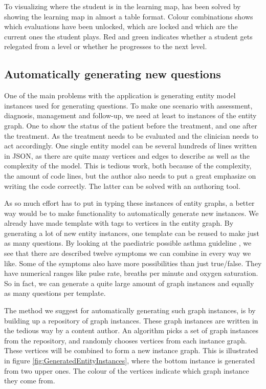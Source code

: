 To visualizing where the student is in the learning map, has been solved by showing the learning map in almost a table format. Colour combinations shows which evaluations have been unlocked, which are locked and which are the current ones the student plays. Red and green indicates whether a student gets relegated from a level or whether he progresses to the next level.	



 
\subsection{Automatically generating new questions}
One of the main problems with the application is generating entity model instances used for generating questions. To make one scenario with assessment, diagnosis, management and follow-up, we need at least to instances of the entity graph. One to show the status of the patient before the treatment, and one after the treatment. As the treatment needs to be evaluated and the clinician needs to act accordingly. One single entity model can be several hundreds of lines written in JSON, as there are quite many vertices and edges to describe as well as the complexity of the model. This is tedious work, both because of the complexity, the amount of code lines, but the author also needs to put a great emphasize on writing the code correctly. The latter can be solved with an authoring tool.

As so much effort has to put in typing these instances of entity graphs, a better way would be to make functionality to automatically generate new instances. We already have made template with tags to vertices in the entity graph. By generating a lot of new entity instances, one template can be reused to make just as many questions. By looking at the paediatric possible asthma guideline \parencite{RepublicofKeny2016}, we see that there are described twelve symptoms we can combine in every way we like. Some of the symptoms also have more possibilities than just true/false. They have numerical ranges like pulse rate, breaths per minute and oxygen saturation. So in fact, we can generate a quite large amount of graph instances and equally as many questions per template.

The method we suggest for automatically generating such graph instances, is by building up a repository of graph instances. These graph instances are written in the tedious way by a content author. An algorithm picks a set of graph instances from the repository, and randomly chooses vertices from each instance graph. These vertices will be combined to form a new instance graph. This is illustrated in figure \ref{fig:GeneratedEntityInstances}, where the bottom instance is generated from two upper ones. The colour of the vertices indicate which graph instance they come from.

